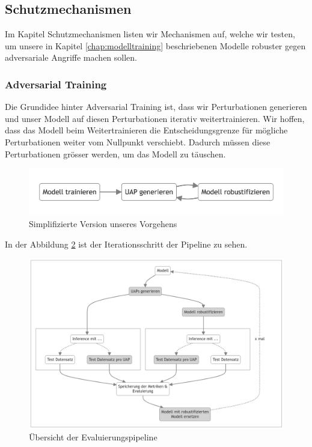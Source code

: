 \subsection{Schutzmechanismen}

Im Kapitel Schutzmechanismen listen wir Mechanismen auf, welche wir testen, um unsere in Kapitel \ref{chap:modelltraining} beschriebenen Modelle robuster gegen adversariale Angriffe machen sollen.

\subsubsection{Adversarial Training} \label{chap:adversarial training}

Die Grundidee hinter Adversarial Training ist, dass wir Perturbationen generieren und unser Modell auf diesen Perturbationen iterativ weitertrainieren. Wir hoffen, dass das Modell beim Weitertrainieren die Entscheidungsgrenze für mögliche Perturbationen weiter vom Nullpunkt verschiebt. Dadurch müssen diese Perturbationen grösser werden, um das Modell zu täuschen.

\begin{figure}[H]
    \centering
    \includegraphics[width=13.5cm]{01-images/04-methodik/simplified_overview.png}
    \caption{Simplifizierte Version unseres Vorgehens}
    \label{fig:07-simplified_overview}
\end{figure}

In der Abbildung \ref{fig:Evaluierungspipeline} ist der Iterationsschritt der Pipeline zu sehen. 

\begin{figure}[H]
    \centering
    \includegraphics[width=\linewidth]{01-images/04-methodik/robustifizierungs-pipeline.png}
    \caption{Übersicht der Evaluierungspipeline}
    \label{fig:Evaluierungspipeline}
\end{figure}


